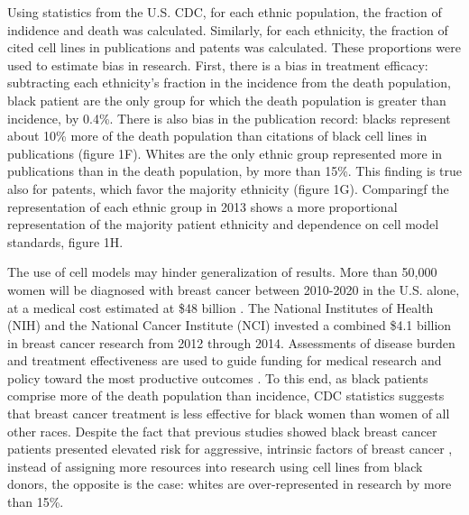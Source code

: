 \documentclass[10pt]{article}
\begin{document}
\begin{multicols}{2}
Using statistics from the U.S. CDC, for each ethnic population, the fraction of indidence and death was calculated. Similarly, for each ethnicity, the fraction of cited cell lines in publications and patents was calculated. These proportions were used to estimate bias in research. First, there is a bias in treatment efficacy: subtracting each ethnicity's fraction in the incidence from the death population, black patient are the only group for which the death population is greater than incidence, by 0.4\%.%
There is also bias in the publication record: blacks represent about 10\% more of the death population than citations of black cell lines in publications (figure 1F). Whites are the only ethnic group represented more in publications than in the death population, by more than 15\%. This finding is true also for patents, which favor the majority ethnicity (figure 1G). Comparingf the representation of each ethnic group in 2013 shows a more proportional representation of the majority patient ethnicity and dependence on cell model standards, figure 1H. %

The use of cell models may hinder generalization of results. More than 50,000 women will be diagnosed with breast cancer between 2010-2020 in the U.S. alone, at a medical cost estimated at \$48 billion \cite{mariotto2011projections, weir2015past}. The National Institutes of Health (NIH) and the National Cancer Institute (NCI) invested a combined \$4.1 billion in breast cancer research from 2012 through 2014. %
Assessments of disease burden and treatment effectiveness are used to guide funding for medical research and policy toward the most productive outcomes \cite{kim2016cancer}. To this end, as black patients comprise more of the death population than incidence, CDC statistics suggests that breast cancer treatment is less effective for black women than women of all other races. Despite the fact that previous studies showed black breast cancer patients presented elevated risk for aggressive, intrinsic factors of breast cancer \cite{huo2009population, reding2012examination}, instead of assigning more resources into research using cell lines from black donors, the opposite is the case: whites are over-represented in research by more than 15\%.


\end{multicols}
\end{document}
